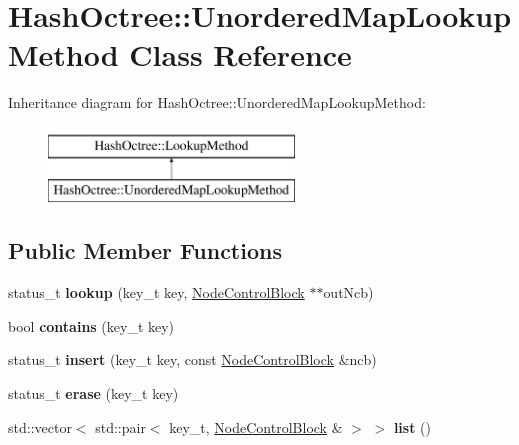 \hypertarget{class_hash_octree_1_1_unordered_map_lookup_method}{}\section{Hash\+Octree\+::Unordered\+Map\+Lookup\+Method Class Reference}
\label{class_hash_octree_1_1_unordered_map_lookup_method}
Inheritance diagram for Hash\+Octree\+::Unordered\+Map\+Lookup\+Method\+:\begin{figure}[H]
\begin{center}
\leavevmode
\includegraphics[height=2.000000cm]{class_hash_octree_1_1_unordered_map_lookup_method}
\end{center}
\end{figure}
\subsection*{Public Member Functions}
\begin{DoxyCompactItemize}
\item 
\mbox{\label{class_hash_octree_1_1_unordered_map_lookup_method_a566367b6ab3ebdb83842b132f761727e}} 
status\+\_\+t {\bfseries lookup} (key\+\_\+t key, \mbox{\hyperlink{class_hash_octree_1_1_node_control_block}{Node\+Control\+Block}} $\ast$$\ast$out\+Ncb)
\item 
\mbox{\label{class_hash_octree_1_1_unordered_map_lookup_method_ae61323460ad01a4d01d2a01af96a92f9}} 
bool {\bfseries contains} (key\+\_\+t key)
\item 
\mbox{\label{class_hash_octree_1_1_unordered_map_lookup_method_ada2ad84204c16c51f28bccfd6bb33ce0}} 
status\+\_\+t {\bfseries insert} (key\+\_\+t key, const \mbox{\hyperlink{class_hash_octree_1_1_node_control_block}{Node\+Control\+Block}} \&ncb)
\item 
\mbox{\label{class_hash_octree_1_1_unordered_map_lookup_method_a929380c4ff575b2fc212f1dac47ba243}} 
status\+\_\+t {\bfseries erase} (key\+\_\+t key)
\item 
\mbox{\label{class_hash_octree_1_1_unordered_map_lookup_method_ab69aaa6761876050f5ddcb59c5104707}} 
std\+::vector$<$ std\+::pair$<$ key\+\_\+t, \mbox{\hyperlink{class_hash_octree_1_1_node_control_block}{Node\+Control\+Block}} \& $>$ $>$ {\bfseries list} ()
\end{DoxyCompactItemize}


